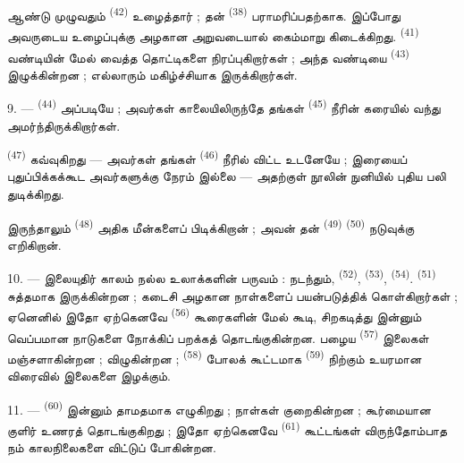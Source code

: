 ஆண்டு முழுவதும்  \textsuperscript{(42)}
உழைத்தார் ; தன்  \textsuperscript{(38)}
பராமரிப்பதற்காக. இப்போது அவருடைய உழைப்புக்கு அழகான அறுவடையால்
கைம்மாறு கிடைக்கிறது. 
\textsuperscript{(41)} வண்டியின் மேல் வைத்த தொட்டிகளை
நிரப்புகிறார்கள் ; அந்த வண்டியை 
\textsuperscript{(43)} இழுக்கின்றன ; எல்லாரும் மகிழ்ச்சியாக
இருக்கிறார்கள்.

\VUsaut{5.0mm}
\VUsaut{3.4mm}

9. ---  \textsuperscript{(44)} அப்படியே ;
அவர்கள் காலையிலிருந்தே தங்கள் 
\textsuperscript{(45)} நீரின் கரையில் வந்து அமர்ந்திருக்கிறார்கள்.

 \textsuperscript{(47)} 
கவ்வுகிறது — அவர்கள் தங்கள்  \textsuperscript{(46)} நீரில்
விட்ட உடனேயே ;
இரையைப் புதுப்பிக்கக்கூட அவர்களுக்கு நேரம் இல்லை — அதற்குள்
நூலின் நுனியில் புதிய பலி துடிக்கிறது.

இருந்தாலும்  \textsuperscript{(48)} அதிக மீன்களைப்
பிடிக்கிறான் ; அவன் தன்  \textsuperscript{(49)}
  \textsuperscript{(50)}
நடுவுக்கு எறிகிறான்.

10. --- இலையுதிர் காலம் நல்ல உலாக்களின் பருவம் : நடந்தும்,
 \textsuperscript{(52)}, 
\textsuperscript{(53)},  \textsuperscript{(54)}.
 \textsuperscript{(51)} சுத்தமாக இருக்கின்றன ; கடைசி
அழகான நாள்களைப் பயன்படுத்திக் கொள்கிறார்கள் ; ஏனெனில் இதோ ஏற்கெனவே
 \textsuperscript{(56)} கூரைகளின் மேல் கூடி,
சிறகடித்து இன்னும் வெப்பமான நாடுகளை நோக்கிப் பறக்கத்
தொடங்குகின்றன. பழைய  \textsuperscript{(57)}
இலைகள் மஞ்சளாகின்றன ;  விழுகின்றன ;
 \textsuperscript{(58)} போலக் கூட்டமாக
 \textsuperscript{(59)} நிற்கும் உயரமான
விரைவில் இலைகளை இழக்கும்.

11. ---  \textsuperscript{(60)} இன்னும் தாமதமாக
எழுகிறது ; நாள்கள் குறைகின்றன ;  கூர்மையான குளிர்
உணரத் தொடங்குகிறது ; இதோ ஏற்கெனவே 
\textsuperscript{(61)} கூட்டங்கள் விருந்தோம்பாத நம் காலநிலைகளை
விட்டுப் போகின்றன.

\VUsaut{6.0mm}
\VUfilet{22mm}
